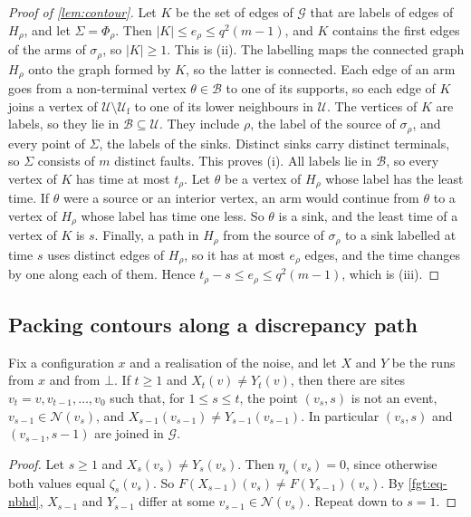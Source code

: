 \begin{proof}[Proof of \cref{lem:contour}]
Let $K$ be the set of edges of $\mathcal G$ that are labels of edges of $H_\rho$, and let $\Sigma=\Phi_\rho$. Then $|K|\le e_\rho\le q^2(m-1)$, and $K$ contains the first edges of the arms of $\sigma_\rho$, so $|K|\ge1$. This is (ii). The labelling maps the connected graph $H_\rho$ onto the graph formed by $K$, so the latter is connected. Each edge of an arm goes from a non-terminal vertex $\theta\in\mathcal B$ to one of its supports, so each edge of $K$ joins a vertex of $\mathcal U\setminus\mathcal U_{\mathrm f}$ to one of its lower neighbours in $\mathcal U$. The vertices of $K$ are labels, so they lie in $\mathcal B\subseteq\mathcal U$. They include $\rho$, the label of the source of $\sigma_\rho$, and every point of $\Sigma$, the labels of the sinks. Distinct sinks carry distinct terminals, so $\Sigma$ consists of $m$ distinct faults. This proves (i). All labels lie in $\mathcal B$, so every vertex of $K$ has time at most $t_\rho$. Let $\theta$ be a vertex of $H_\rho$ whose label has the least time. If $\theta$ were a source or an interior vertex, an arm would continue from $\theta$ to a vertex of $H_\rho$ whose label has time one less. So $\theta$ is a sink, and the least time of a vertex of $K$ is $s$. Finally, a path in $H_\rho$ from the source of $\sigma_\rho$ to a sink labelled at time $s$ uses distinct edges of $H_\rho$, so it has at most $e_\rho$ edges, and the time changes by one along each of them. Hence $t_\rho-s\le e_\rho\le q^2(m-1)$, which is (iii).
\end{proof}

\subsection{Packing contours along a discrepancy path}\label{fgt:sec-packing}

\begin{lemma}\label{fgt:path}
Fix a configuration $x$ and a realisation of the noise, and let $X$ and $Y$ be the runs from $x$ and from $\bot$. If $t\ge1$ and $X_t(v)\ne Y_t(v)$, then there are sites $v_t=v,v_{t-1},\dots,v_0$ such that, for $1\le s\le t$, the point $(v_s,s)$ is not an event, $v_{s-1}\in\mathcal N(v_s)$, and $X_{s-1}(v_{s-1})\ne Y_{s-1}(v_{s-1})$. In particular $(v_s,s)$ and $(v_{s-1},s-1)$ are joined in $\mathcal G$.
\end{lemma}

\begin{proof}
Let $s\ge1$ and $X_s(v_s)\ne Y_s(v_s)$. Then $\eta_s(v_s)=0$, since otherwise both values equal $\zeta_s(v_s)$. So $F(X_{s-1})(v_s)\ne F(Y_{s-1})(v_s)$. By \eqref{fgt:eq-nbhd}, $X_{s-1}$ and $Y_{s-1}$ differ at some $v_{s-1}\in\mathcal N(v_s)$. Repeat down to $s=1$.
\end{proof}

